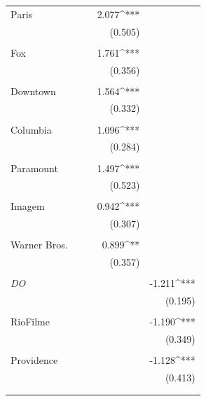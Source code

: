\documentclass[11pt,a4paper]{article}
\begin{document}
\begin{table}[!htbp]
\begin{adjustbox}{width=0.88\textwidth}
\begin{tabular}{@{\extracolsep{5pt}}lD{.}{.}{-3} D{.}{.}{-3} D{.}{.}{-3} D{.}{.}{-3} }
  \quad Paris &  &  & 2.077^{***} &  \\ 
  &  &  & (0.505) &  \\  
  & & & & \\ 
  
 \quad Fox &  &  & 1.761^{***} &  \\ 
  &  &  & (0.356) &  \\ 
  & & & & \\ 

  
 \quad Downtown  &  &  & 1.564^{***} &  \\ 
  &  &  & (0.332) &  \\ 
  & & & & \\
  
 \quad Columbia &  &  & 1.096^{***} &  \\ 
  &  &  & (0.284) &  \\ 
  & & & & \\
  
 \quad Paramount &  &  & 1.497^{***} &  \\ 
  &  &  & (0.523) &  \\ 
  & & & & \\
  
 \quad Imagem &  &  & 0.942^{***} &  \\ 
  &  &  & (0.307) &  \\ 
  & & & & \\ 
  
 \quad Warner Bros. &  &  & 0.899^{**} &  \\ 
  &  &  & (0.357) &  \\ 
  & & & & \\   
  
  
 \quad \textit{DO} &  &  &  & -1.211^{***} \\ 
  &  &  &  & (0.195) \\ 
  & & & & \\  
  
 \quad RioFilme &  &  &  & -1.190^{***} \\ 
  &  &  &  & (0.349) \\
  & & & & \\ 

  
 \quad Providence  &  &  &  & -1.128^{***} \\ 
  &  &  &  & (0.413) \\ 
  & & & & \\
  

  
\hline \\[-1.8ex] 



\end{tabular}
\end{adjustbox}
\end{table}
\end{document}
